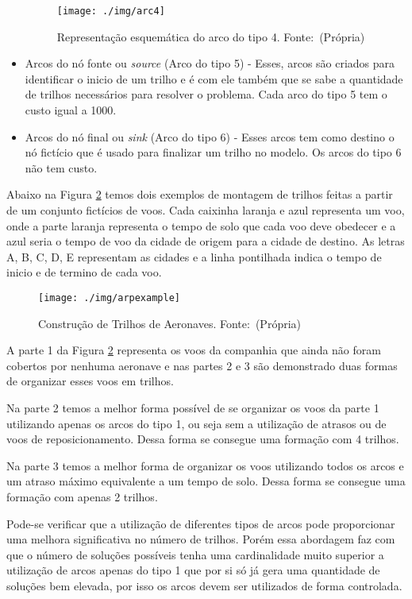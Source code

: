 \begin{itemize}
\begin{figure}[ht]
	\caption{Representação esquemática do arco do tipo 4. \mbox{Fonte: (Própria)}}
	\label{fig:arc4}
	\texttt{[image: ./img/arc4]}
	
\end{figure}

\item Arcos do nó fonte ou \textit{source} (Arco do tipo 5) - Esses, arcos são criados para identificar o inicio de um trilho e é com
 ele também que se sabe a quantidade de trilhos necessários para resolver o problema. Cada arco do tipo 5 tem o custo
  igual a 1000.

\item Arcos do nó final ou \textit{sink} (Arco do tipo 6) - Esses arcos tem como destino o nó fictício que é usado para finalizar um
  trilho no modelo. Os arcos do tipo 6 não tem custo.

\end{itemize}

Abaixo na Figura \ref{fig:arpexample} temos dois exemplos de montagem de trilhos feitas a partir de um conjunto fictícios de voos. Cada caixinha laranja e azul representa um voo, onde a parte laranja representa o tempo de solo que cada voo deve obedecer e a azul seria o tempo de voo da cidade de origem para a cidade de destino. As letras A, B, C, D, E representam as cidades e a linha pontilhada indica o tempo de inicio e de termino de cada voo.

\begin{figure}[ht]
	\caption{Construção de Trilhos de Aeronaves. \mbox{Fonte: (Própria)}}
	\label{fig:arpexample}
	\texttt{[image: ./img/arpexample]}
	
\end{figure}

A parte 1 da Figura \ref{fig:arpexample} representa os voos da companhia que ainda não foram cobertos por nenhuma aeronave e nas partes 2 e 3 são demonstrado duas formas de organizar esses voos em trilhos. 

	Na parte 2 temos a melhor forma possível de se organizar os voos da parte 1 utilizando apenas os arcos do tipo 1, ou seja sem a utilização de atrasos ou de voos de reposicionamento. Dessa forma se consegue uma formação com 4 trilhos.

	Na parte 3 temos a melhor forma de organizar os voos utilizando todos os arcos e um atraso máximo equivalente a um tempo de solo. Dessa forma se consegue uma formação com apenas 2 trilhos.

	Pode-se verificar que a utilização de diferentes tipos de arcos pode proporcionar uma melhora significativa  no número de trilhos. Porém essa abordagem faz com que o número de soluções possíveis tenha uma cardinalidade muito superior a utilização de arcos apenas do tipo 1 que por si só já gera uma quantidade de soluções bem elevada, por isso os arcos devem ser utilizados de forma controlada. 


  
